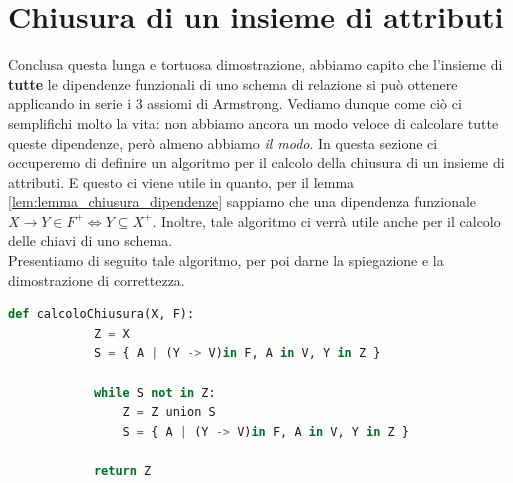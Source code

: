 \documentclass[12pt]{report}
\newcommand{\ra}{
	\rightarrow
}
\begin{document}
	\section{Chiusura di un insieme di attributi}
	Conclusa questa lunga e tortuosa dimostrazione, abbiamo capito che l'insieme di \textbf{tutte} le dipendenze funzionali di uno schema di relazione si può ottenere applicando in serie i 3 assiomi di Armstrong. Vediamo dunque come ciò ci semplifichi molto la vita: non abbiamo ancora un modo veloce di calcolare tutte queste dipendenze, però almeno abbiamo \textit{il modo}. In questa sezione ci occuperemo di definire un algoritmo per il calcolo della chiusura di un insieme di attributi. E questo ci viene utile in quanto, per il lemma \ref{lem:lemma_chiusura_dipendenze} sappiamo che una dipendenza funzionale $X \ra Y \in F^+ \iff Y \subseteq X^+$. Inoltre, tale algoritmo ci verrà utile anche per il calcolo delle chiavi di uno schema.\\
	Presentiamo di seguito tale algoritmo, per poi darne la spiegazione e la dimostrazione di correttezza.
	\begin{lstlisting}[language=Python]
		def calcoloChiusura(X, F):
			Z = X
			S = { A | (Y -> V)in F, A in V, Y in Z }
			
			while S not in Z:
				Z = Z union S
				S = { A | (Y -> V)in F, A in V, Y in Z }
				
			return Z
	\end{lstlisting}
	
\end{document}
